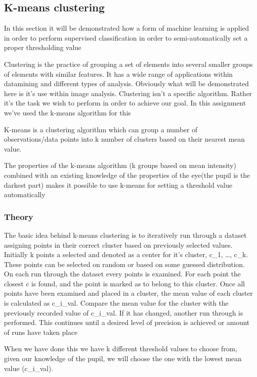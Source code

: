 \subsection{K-means clustering}

In this section it will be demonstrated how a form of machine learning
is applied in order to perform supervised classification in order to
semi-automatically set a proper thresholding value

Clustering is the practice of grouping a set of elements into several
smaller groups of elements with similar features. It has a wide range of
applications within datamining and different types of analysis.
Obviously what will be demonstrated here is it's use within image
analysis. Clustering isn't a specific algorithm. Rather it's the task we
wish to perform in order to achieve our goal. In this assignment we've
used the k-means algorithm for this

K-means is a clustering algorithm which can group a number of
observations/data points into k number of clusters based on their
nearest mean value.

The properties of the k-means algorithm (k groups based on mean
intensity) combined with an existing knowledge of the properties of the
eye(the pupil is the darkest part) makes it possible to use k-means for
setting a threshold value automatically

\subsubsection{Theory}

The basic idea behind k-means clustering is to iteratively run through a
dataset assigning points in their correct cluster based on previously
selected values. Initially k points a selected and denoted as a center
for it's cluster, c\_1, \ldots{}, c\_k. These points can be selected on
random or based on some guessed distribution. On each run through the
dataset every points is examined. For each point the closest c is found,
and the point is marked as to belong to this cluster. Once all points
have been examined and placed in a cluster, the mean value of each
cluster is calculated as c\_i\_val. Compare the mean value for the
cluster with the previously recorded value of c\_i\_val. If it has
changed, another run through is performed. This continues until a
desired level of precision is achieved or amount of runs have taken
place

When we have done this we have k different threshold values to choose
from, given our knowledge of the pupil, we will choose the one with the
lowest mean value (c\_i\_val).

